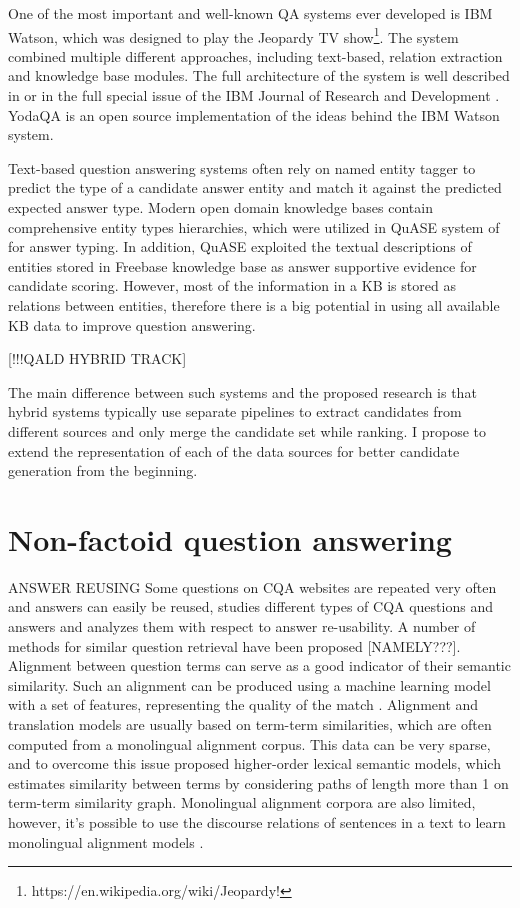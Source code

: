 One of the most important and well-known QA systems ever developed is IBM Watson, which was designed to play the Jeopardy TV show\footnote{https://en.wikipedia.org/wiki/Jeopardy!}.
The system combined multiple different approaches, including text-based, relation extraction and knowledge base modules.
The full architecture of the system is well described in \cite{ferrucci2010building} or in the full special issue of the IBM Journal of Research and Development \cite{ibm_watson_special_issue}.
YodaQA \cite{baudivs2015yodaqa} is an open source implementation of the ideas behind the IBM Watson system.

Text-based question answering systems often rely on named entity tagger to predict the type of a candidate answer entity and match it against the predicted expected answer type.
Modern open domain knowledge bases contain comprehensive entity types hierarchies, which were utilized in QuASE system of \cite{Sun:2015:ODQ:2736277.2741651} for answer typing.
In addition, QuASE exploited the textual descriptions of entities stored in Freebase knowledge base as answer supportive evidence for candidate scoring.
However, most of the information in a KB is stored as relations between entities, therefore there is a big potential in using all available KB data to improve question answering.

[!!!QALD HYBRID TRACK]

The main difference between such systems and the proposed research is that hybrid systems typically use separate pipelines to extract candidates from different sources and only merge the candidate set while ranking.
I propose to extend the representation of each of the data sources for better candidate generation from the beginning.


\section{Non-factoid question answering}

ANSWER REUSING
Some questions on CQA websites are repeated very often and answers can easily be reused, \cite{Liu:2008:USA:1599081.1599144} studies different types of CQA questions and answers and analyzes them with respect to answer re-usability.
A number of methods for similar question retrieval have been proposed [NAMELY???].
Alignment between question terms can serve as a good indicator of their semantic similarity.
Such an alignment can be produced using a machine learning model with a set of features, representing the quality of the match \cite{wang2015faq}.
Alignment and translation models are usually based on term-term similarities, which are often computed from a monolingual alignment corpus.
This data can be very sparse, and to overcome this issue \cite{fried2015higher} proposed higher-order lexical semantic models, which estimates similarity between terms by considering paths of length more than 1 on term-term similarity graph.
Monolingual alignment corpora are also limited, however, it's possible to use the discourse relations of sentences in a text to learn monolingual alignment models \cite{sharp2015spinning}.

